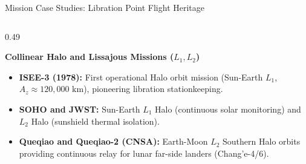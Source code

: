 \documentclass[aspectratio=169, 10pt]{beamer}
\begin{document}
\begin{frame}{Mission Case Studies: Libration Point Flight Heritage}
    \begin{columns}[t]
        \begin{column}{0.49\textwidth}
            \begin{block}{\textbf{Collinear Halo and Lissajous Missions ($L_1, L_2$)}}
                \scriptsize
                \begin{itemize}\setlength{\itemsep}{2pt}
                    \item \textbf{ISEE-3 (1978):} First operational Halo orbit mission (Sun-Earth $L_1$, $A_z \approx 120,000\text{ km}$), pioneering libration stationkeeping.
                    \item \textbf{SOHO and JWST:} Sun-Earth $L_1$ Halo (continuous solar monitoring) and $L_2$ Halo (sunshield thermal isolation).
                    \item \textbf{Queqiao and Queqiao-2 (CNSA):} Earth-Moon $L_2$ Southern Halo orbits providing continuous relay for lunar far-side landers (Chang'e-4/6).
                \end{itemize}
            \end{block}
        \end{column}
        

\end{columns}
\end{frame}
\end{document}

